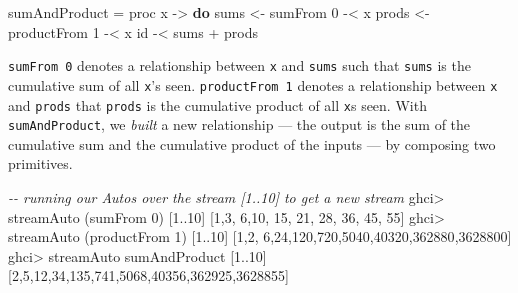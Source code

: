 \documentclass[]{article}
\newenvironment{Shaded}{}{}
\newcommand{\CommentTok}[1]{\textcolor[rgb]{0.38,0.63,0.69}{\textit{#1}}}
\newcommand{\DecValTok}[1]{\textcolor[rgb]{0.25,0.63,0.44}{#1}}
\newcommand{\FunctionTok}[1]{\textcolor[rgb]{0.02,0.16,0.49}{#1}}
\newcommand{\KeywordTok}[1]{\textcolor[rgb]{0.00,0.44,0.13}{\textbf{#1}}}
\newcommand{\NormalTok}[1]{#1}
\newcommand{\OperatorTok}[1]{\textcolor[rgb]{0.40,0.40,0.40}{#1}}
\newcommand{\OtherTok}[1]{\textcolor[rgb]{0.00,0.44,0.13}{#1}}
\begin{document}
\begin{Shaded}
\begin{Highlighting}[]
\NormalTok{sumAndProduct }\OtherTok{=}\NormalTok{ proc x }\OtherTok{{-}\textgreater{}} \KeywordTok{do}
\NormalTok{    sums  }\OtherTok{\textless{}{-}}\NormalTok{ sumFrom }\DecValTok{0}     \OperatorTok{{-}\textless{}}\NormalTok{ x}
\NormalTok{    prods }\OtherTok{\textless{}{-}}\NormalTok{ productFrom }\DecValTok{1} \OperatorTok{{-}\textless{}}\NormalTok{ x}
    \FunctionTok{id} \OperatorTok{{-}\textless{}}\NormalTok{ sums }\OperatorTok{+}\NormalTok{ prods}
\end{Highlighting}
\end{Shaded}

\texttt{sumFrom\ 0} denotes a relationship between \texttt{x} and \texttt{sums}
such that \texttt{sums} is the cumulative sum of all \texttt{x}'s seen.
\texttt{productFrom\ 1} denotes a relationship between \texttt{x} and
\texttt{prods} that \texttt{prods} is the cumulative product of all \texttt{x}s
seen. With \texttt{sumAndProduct}, we \emph{built} a new relationship --- the
output is the sum of the cumulative sum and the cumulative product of the inputs
--- by composing two primitives.

\begin{Shaded}
\begin{Highlighting}[]
\CommentTok{{-}{-} running our Autos over the stream [1..10] to get a new stream}
\NormalTok{ghci}\OperatorTok{\textgreater{}}\NormalTok{ streamAuto\textquotesingle{} (sumFrom }\DecValTok{0}\NormalTok{) [}\DecValTok{1}\OperatorTok{..}\DecValTok{10}\NormalTok{]}
\NormalTok{[}\DecValTok{1}\NormalTok{,}\DecValTok{3}\NormalTok{, }\DecValTok{6}\NormalTok{,}\DecValTok{10}\NormalTok{, }\DecValTok{15}\NormalTok{, }\DecValTok{21}\NormalTok{,  }\DecValTok{28}\NormalTok{,   }\DecValTok{36}\NormalTok{,    }\DecValTok{45}\NormalTok{,     }\DecValTok{55}\NormalTok{]}
\NormalTok{ghci}\OperatorTok{\textgreater{}}\NormalTok{ streamAuto\textquotesingle{} (productFrom }\DecValTok{1}\NormalTok{) [}\DecValTok{1}\OperatorTok{..}\DecValTok{10}\NormalTok{]}
\NormalTok{[}\DecValTok{1}\NormalTok{,}\DecValTok{2}\NormalTok{, }\DecValTok{6}\NormalTok{,}\DecValTok{24}\NormalTok{,}\DecValTok{120}\NormalTok{,}\DecValTok{720}\NormalTok{,}\DecValTok{5040}\NormalTok{,}\DecValTok{40320}\NormalTok{,}\DecValTok{362880}\NormalTok{,}\DecValTok{3628800}\NormalTok{]}
\NormalTok{ghci}\OperatorTok{\textgreater{}}\NormalTok{ streamAuto\textquotesingle{} sumAndProduct [}\DecValTok{1}\OperatorTok{..}\DecValTok{10}\NormalTok{]}
\NormalTok{[}\DecValTok{2}\NormalTok{,}\DecValTok{5}\NormalTok{,}\DecValTok{12}\NormalTok{,}\DecValTok{34}\NormalTok{,}\DecValTok{135}\NormalTok{,}\DecValTok{741}\NormalTok{,}\DecValTok{5068}\NormalTok{,}\DecValTok{40356}\NormalTok{,}\DecValTok{362925}\NormalTok{,}\DecValTok{3628855}\NormalTok{]}
\end{Highlighting}
\end{Shaded}
\end{document}
